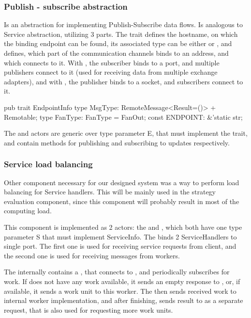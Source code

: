 \subsubsection{Publish - subscribe abstraction}
Is an abstraction for implementing Publish-Subscribe data flows.
Is analogous to Service abstraction, utilizing 3 parts. The  trait defines the hostname, on which
the binding endpoint can be found, its associated type  can be either  or ,
and defines, which part of the communication channels binds to an address, and which connects to it.
With , the subscriber binds to a port, and multiple publishers connect to it (used for receiving data from multiple exchange adapters),
and with , the publisher binds to a socket, and subscribers connect to it.

\begin{code}[language=rust,label={endpointinfo_trait},caption={EndpointInfo trait definition}]
pub trait EndpointInfo {
    type MsgType: RemoteMessage<Result=()> + Remotable;
    type FanType: FanType = FanOut;
    const ENDPOINT: &'static str;
}
\end{code}

The  and  actors are generic over type parameter E, that must implement the 
trait, and contain methods for publishing and subscribing to updates respectively.

\subsubsection{Service load balancing}
Other component necessary for our designed system was a way to perform load balancing for Service handlers.
This will be mainly used in the strategy evaluation component, since this component will probably result in most
of the computing load.

This component is implemented as 2 actors: the  and , which both have one type
parameter S that must implement ServiceInfo. The  binds 2 ServiceHandlers to single port.
The first one is used for receiving service requests from client, and the second one is used for receiving messages from workers.

The  internally contains a , that connects to , and periodically subscribes
for work. If  does not have any work available, it sends an empty response to ,
or, if available, it sends a work unit to this worker. The  then sends received work to internal
worker implementation, and after finishing, sends result to  as a separate request, that is also used
for requesting more work units.

